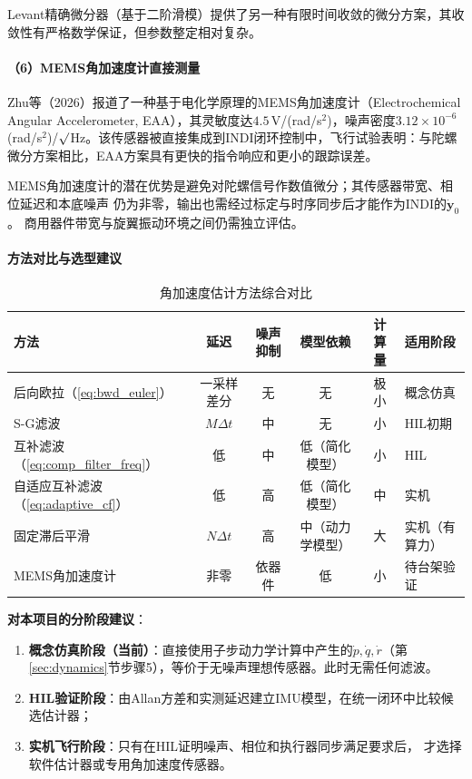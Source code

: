 Levant精确微分器\cite{levant1998robust}（基于二阶滑模）提供了另一种有限时间收敛的微分方案，其收敛性有严格数学保证，但参数整定相对复杂。

\paragraph{（6）MEMS角加速度计直接测量}

Zhu等（2026）\cite{zhu2026mems}报道了一种基于电化学原理的MEMS角加速度计（Electrochemical Angular Accelerometer, EAA），其灵敏度达$4.5$\,V/(rad/s$^2$)，噪声密度$3.12\times10^{-6}$\,(rad/s$^2$)/$\surd$Hz。该传感器被直接集成到INDI闭环控制中，飞行试验表明：与陀螺微分方案相比，EAA方案具有更快的指令响应和更小的跟踪误差\cite{zhu2026mems}。

MEMS角加速度计的潜在优势是避免对陀螺信号作数值微分；其传感器带宽、相位延迟和本底噪声
仍为非零，输出也需经过标定与时序同步后才能作为INDI的$\dot{\mathbf y}_0$。
商用器件带宽与旋翼振动环境之间仍需独立评估。

\paragraph{方法对比与选型建议}

\begin{table}[H]
\centering
\caption{角加速度估计方法综合对比}
\label{tab:accel_methods}
\setlength{\tabcolsep}{3pt}
\small
\begin{tabularx}{\textwidth}{>{\raggedright\arraybackslash}p{2.2cm} c c c c >{\raggedright\arraybackslash}X}
\toprule
\textbf{方法} & \textbf{延迟} & \textbf{噪声抑制} & \textbf{模型依赖} & \textbf{计算量} & \textbf{适用阶段} \\
\midrule
后向欧拉（\ref{eq:bwd_euler}） & 一采样差分 & 无 & 无 & 极小 & 概念仿真 \\
S-G滤波 & $M\Delta t$ & 中 & 无 & 小 & HIL初期 \\
互补滤波（\ref{eq:comp_filter_freq}） & 低 & 中 & 低（简化模型） & 小 & HIL \\
自适应互补滤波（\ref{eq:adaptive_cf}） & 低 & 高 & 低（简化模型） & 中 & 实机 \\
固定滞后平滑 & $N\Delta t$ & 高 & 中（动力学模型） & 大 & 实机（有算力） \\
MEMS角加速度计 & 非零 & 依器件 & 低 & 小 & 待台架验证 \\
\bottomrule
\end{tabularx}
\end{table}

\textbf{对本项目的分阶段建议}：
\begin{enumerate}[label=(\arabic*)]
    \item \textbf{概念仿真阶段（当前）}：直接使用子步动力学计算中产生的$\dot{p},\dot{q},\dot{r}$（第\ref{sec:dynamics}节步骤5），等价于无噪声理想传感器。此时无需任何滤波。
    \item \textbf{HIL验证阶段}：由Allan方差和实测延迟建立IMU模型，在统一闭环中比较候选估计器；
    \item \textbf{实机飞行阶段}：只有在HIL证明噪声、相位和执行器同步满足要求后，
          才选择软件估计器或专用角加速度传感器。
\end{enumerate}

